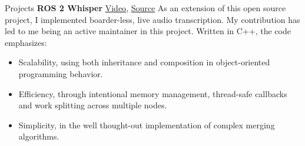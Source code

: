 \begin{rubric}{Projects}
\entry*[2024] \textbf{ROS 2 Whisper} \hfill \href{https://github.com/ros-ai/ros2_whisper/blob/main/doc/harry_potter_sample.gif}{Video}, \href{https://github.com/ros-ai/ros2_whisper}{\faGithub Source} \newline
As an extension of this open source project, I implemented boarder-less, live audio transcription. My contribution has led to me being an active maintainer in this project.  Written in C++, the code emphasizes: \newline
\vspace{\CVItemizeHeaderSpacing} \begin{itemize}
	\setlength{\itemsep}{\CVItemizeSpacing}
	\item Scalability, using both inheritance and composition in object-oriented programming behavior.
	\item Efficiency, through intentional memory management, thread-safe callbacks and work splitting across multiple nodes.
	\item Simplicity, in the well thought-out implementation of complex merging algorithms.
\end{itemize}
\begin{comment}
\entry*[2024] \textbf{ROS 2 Computer Vision} \hfill \href{https://github.com/NathanCorral/ROS-HF-Vision/blob/main/doc/gifs/ex_german_roads.gif}{Video}, \href{https://github.com/NathanCorral/ROS-HF-Vision/tree/main}{\faGithub Source} \newline
Running multiple computer vision models (DETR, Maskformer) trained across different datasets/tasks on a live camera feed introduces several implementation challenges. This Python repository presents a solution for: \newline
\vspace{\CVItemizeHeaderSpacing} \begin{itemize}
	\setlength{\itemsep}{\CVItemizeSpacing}
	\item Downloading and running state-of-the-art models from Hugging Face as asynchronous ROS 2 nodes.
	\item Hosting a label server for re-addressing model outputs into a global database.
	\item Displaying segmentation masks and bounding boxes as a Matplotlib animation.
	\item Publishing dataset images for repeatable evaluation of CV models.
\end{itemize}
\end{comment}

\end{rubric}
